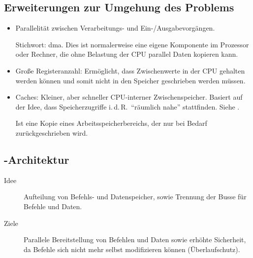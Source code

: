 \subsection[Erweiterungen]{Erweiterungen zur Umgehung des Problems}
\begin{itemize}
  \item Parallelität zwischen Verarbeitungs- und Ein-/Ausgabevorgängen.

	Stichwort: \gls{dma}.
	Dies ist normalerweise eine eigene Komponente im Prozessor oder Rechner, die ohne Belastung der CPU parallel Daten kopieren kann.

  \item Große Registeranzahl: Ermöglicht, dass Zwischenwerte in der CPU gehalten werden können und somit nicht in den Speicher geschrieben werden müssen.

  \item {}
	Caches: Kleiner, aber schneller CPU-interner Zwischenspeicher.
	Basiert auf der Idee, dass Speicherzugriffe i.\,d.\,R.~\enquote{räumlich nahe} stattfinden.
	Siehe .

	Ist eine Kopie eines Arbeitsspeicherbereichs, der nur bei Bedarf zu\-rück\-ge\-schrieb\-en wird.
\end{itemize}

\subsection{-Architektur}
\begin{description}
  \item [{Idee}] 
	Aufteilung von Befehls- und Datenspeicher, sowie Trennung der Busse für Befehle und Daten.
  \item [{Ziele}]
	Parallele Bereitstellung von Befehlen und Daten sowie erhöhte Sicherheit, da Befehle sich nicht mehr selbst modifizieren können (Über\-lauf\-schutz).
\end{description}


